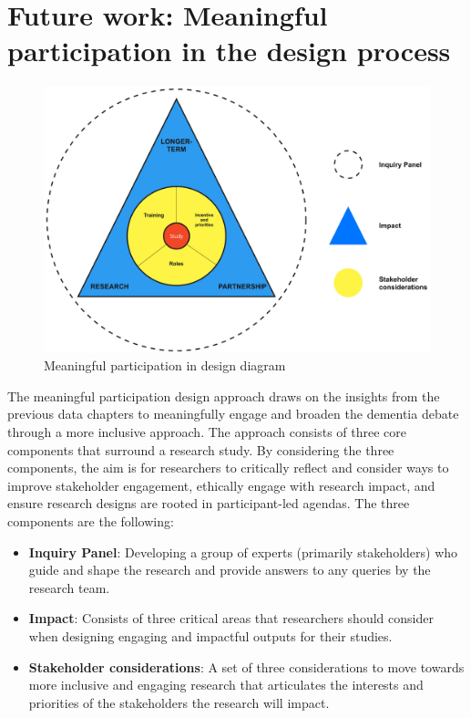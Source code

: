 \section{Future work: Meaningful participation in the design process}
\label{Discussion:Design}

\begin{figure}[htp]
\centering
\includegraphics[width=0.8\linewidth]{Images/Discussion/DesignApproach.jpg}
\caption{Meaningful participation in design diagram}
\label{fig:MeaningfulParticipation}
\end{figure}
The meaningful participation design approach draws on the insights from the previous data chapters to meaningfully engage and broaden the dementia debate through a more inclusive approach. The approach consists of three core components that surround a research study. By considering the three components, the aim is for researchers to critically reflect and consider ways to improve stakeholder engagement, ethically engage with research impact, and ensure research designs are rooted in participant-led agendas. The three components are the following:

\begin{itemize}
    \item \textbf{Inquiry Panel}: Developing a group of experts (primarily stakeholders) who guide and shape the research and provide answers to any queries by the research team.
    \item \textbf{Impact}: Consists of three critical areas that researchers should consider when designing engaging and impactful outputs for their studies.
    \item \textbf{Stakeholder considerations}: A set of three considerations to move towards more inclusive and engaging research that articulates the interests and priorities of the stakeholders the research will impact.
\end{itemize}

